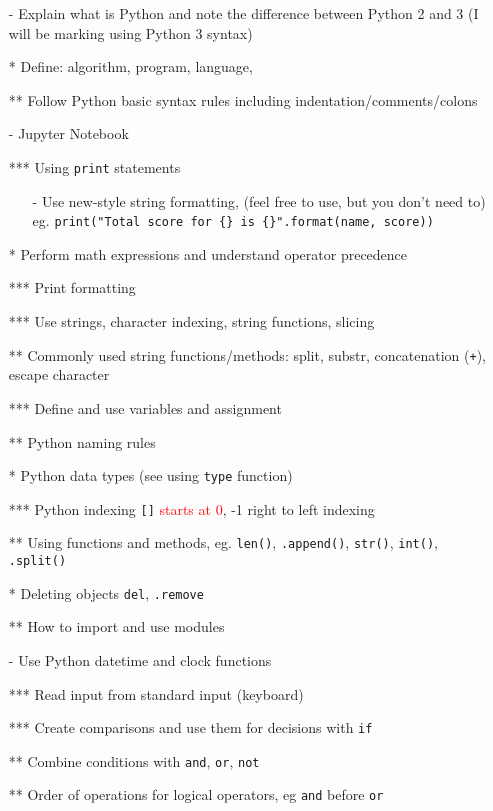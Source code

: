 \documentclass[12pt]{article}%
\begin{document}
\begin{itemize}
 \setlength{\itemsep}{1pt}%
    \setlength{\parskip}{1pt}
\item[-] Explain what is Python and note the difference between Python 2 and 3 (I will be marking using Python 3 syntax)
\item[*] Define: algorithm, program, language, %
\item[**] Follow Python basic syntax rules including indentation/comments/colons
\item[-] Jupyter Notebook
\item[***] Using \verb|print| statements
\begin{itemize}
\item[-] Use new-style string formatting, (feel free to use, but you don't need to) \newline
eg. \verb|print("Total score for {} is {}".format(name, score))|
\end{itemize}
\item[*] Perform math expressions and understand operator precedence
\item[***] Print formatting 
\item[***] Use strings, character indexing, string functions, slicing
\item[**] Commonly used string functions/methods: split, substr, concatenation (\verb|+|), escape character
\item[***] Define and use variables and assignment
\item[**] Python naming rules
\item[*]  Python data types (see using {\tt type} function)
\item[***] Python indexing \verb|[]| \textcolor{red}{starts at 0}, -1 right to left indexing
\item[**] Using functions and methods, eg. \verb|len()|, \verb|.append()|, \verb|str()|, \verb|int()|, \verb|.split()|
\item[*] Deleting objects {\tt del}, {\tt .remove}
\item[**] How to import and use modules
\item[-] Use Python datetime and clock functions
\item[***] Read input from standard input (keyboard)
\item[***] Create comparisons and use them for decisions with {\tt if}
\item[**] Combine conditions with {\tt and}, {\tt or}, {\tt not}
\item[**] Order of operations for logical operators, eg {\tt and} before {\tt or}

\end{itemize}
\end{document}
